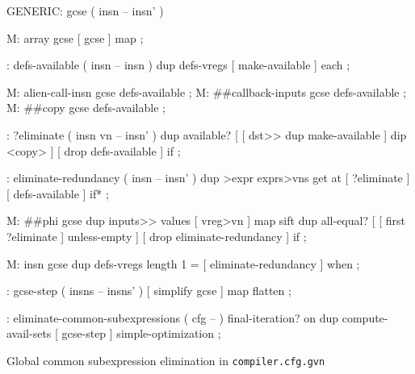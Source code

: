 \centering

  \begin{factorcode}
    GENERIC: gcse ( insn -- insn' )

    M: array gcse [ gcse ] map ;

    : defs-available ( insn -- insn )
        dup defs-vregs [ make-available ] each ;

    M: alien-call-insn gcse defs-available ;
    M: ##callback-inputs gcse defs-available ;
    M: ##copy gcse defs-available ;

    : ?eliminate ( insn vn -- insn' )
        dup available? [
            [ dst>> dup make-available ] dip <copy>
        ] [ drop defs-available ] if ;

    : eliminate-redundancy ( insn -- insn' )
        dup >expr exprs>vns get at
        [ ?eliminate ] [ defs-available ] if* ;

    M: ##phi gcse
        dup inputs>> values [ vreg>vn ] map sift
        dup all-equal? [
            [ first ?eliminate ] unless-empty
        ] [ drop eliminate-redundancy ] if ;

    M: insn gcse
        dup defs-vregs length 1 = [ eliminate-redundancy ] when ;

    : gcse-step ( insns -- insns' )
        [ simplify gcse ] map flatten ;

    : eliminate-common-subexpressions ( cfg -- )
        final-iteration? on
        dup compute-avail-sets
        [ gcse-step ] simple-optimization ;
  \end{factorcode}

\caption{Global common subexpression elimination in \texttt{compiler.cfg.gvn}}
